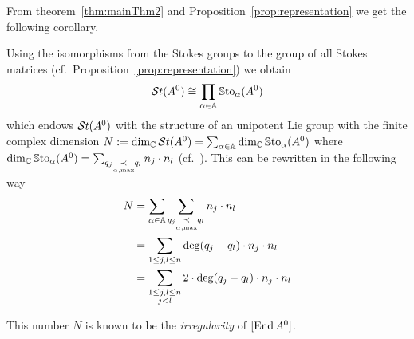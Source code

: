 From theorem~\ref{thm:mainThm2} and Proposition~\ref{prop:representation} we
get the following corollary.
\begin{cor}\label{cor:isomToChochN}
  Using the isomorphisms from the Stokes groups to the group of all Stokes
  matrices (cf.\ Proposition~\ref{prop:representation}) we obtain
  \[
    \mathcal{S}{}t(A^0) \cong \prod_{\alpha\in\mathbb{A}}\operatorname{\mathbb{S}to}_\alpha(A^0)
  \]
  which endows $\mathcal{S}{}t(A^0)$ with the structure of an unipotent Lie group with the
  finite complex dimension
  $N:=\dim_\mathbb{C}\mathcal{S}{}t(A^0)=\sum_{\alpha\in\mathbb{A}}\dim_\mathbb{C}\operatorname{\mathbb{S}to}_\alpha(A^0)$ where
  $\dim_\mathbb{C}\operatorname{\mathbb{S}to}_\alpha(A^0)=\sum_{q_j\underset{\alpha,\max}{\prec} q_l}
  n_j\cdot n_l$ (cf.~\cite[Sec.III.1]{Loday1994}).
  This can be rewritten in the following way
  \begin{align*}
    N&=\sum_{\alpha\in\mathbb{A}}\sum_{q_j\underset{\alpha,\max}{\prec}q_l}n_j\cdot n_l
    \\&= \sum_{1\leq j,l\leq n}\deg(q_j-q_l)\cdot n_j\cdot n_l
    \\&=\sum_{\substack{1\leq j,l\leq n\\j<l}}2\cdot\deg(q_j-q_l)\cdot
      n_j\cdot n_l
  \end{align*}
  \begin{s-rem}
    This number $N$ is known to be the \emph{irregularity} of $[\operatorname{End} A^0]$.
  \end{s-rem}
\end{cor}
\begin{comment}
  \marginnote{\cite[880f]{Loday1994}}
  We have also two structures of a linear affine variety on the set $\St(A^0)$.
  \begin{rem}
    Let $\sto_\alpha(A^0)$ be the Lie algebra corresponding to
    $\Sto_\alpha(A^0)$. The exponential map\footnote{This is not the map $\exp$
    from section~\ref{sec:mainThm1}.} induces an homomorphism
    $\exp:\sto_\alpha(A^0)\to\Sto_\alpha(A^0)$ and denote by $\ln=\exp^{-1}$
    the inverse map.
    \begin{enumerate}
      \item The \emph{tangent linear structure} is defined as \TODO
      \item Using the map
        \begin{align*}
          \sto_{\alpha}(A^0) &\overset{\id+\cdot}\longrightarrow
          \Sto_{\alpha}(A^0)
        \\\dot{f}_\alpha & \longmapsto \id+\dot{f}_\alpha \,.
        \end{align*}
    \end{enumerate}
  \end{rem}
\end{comment}

